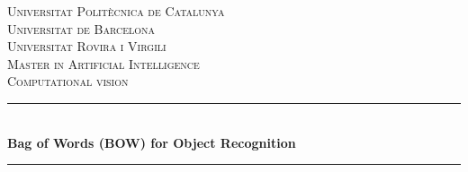 \begin{titlepage}

\vspace*{\fill}

\newcommand{\HRule}{\rule{\linewidth}{0.5mm}} %

\center %
 

\textsc{\LARGE Universitat Politècnica de Catalunya}\\[0.5cm] %
\textsc{\LARGE Universitat de Barcelona}\\[0.5cm] %
\textsc{\LARGE Universitat Rovira i Virgili}\\[1.5cm] %
\textsc{\Large Master in Artificial Intelligence}\\[0.5cm] %
\textsc{\large Computational vision}\\[0.5cm] %


\HRule \\[0.4cm]
{ \huge \bfseries Bag of Words (BOW) for Object Recognition}\\[0.4cm] %
\HRule \\[1.5cm]
 



\end{titlepage}
